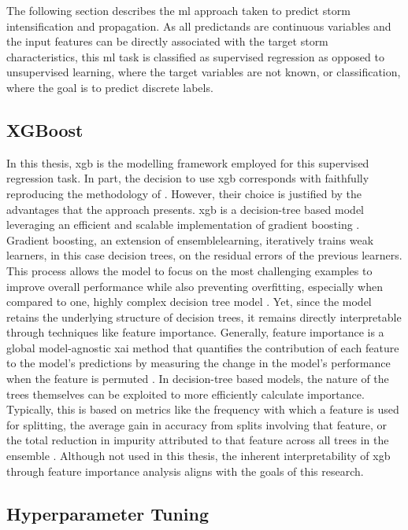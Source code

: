 The following section describes the \acrshort{ml} approach taken to predict storm intensification and propagation. As all predictands are continuous variables and the input features can be directly associated with the target storm characteristics, this \acrshort{ml} task is classified as supervised regression as opposed to unsupervised learning, where the target variables are not known, or classification, where the goal is to predict discrete labels.

\subsection{XGBoost}

In this thesis, \acrfull{xgb} is the modelling framework employed for this supervised regression task. In part, the decision to use \acrshort{xgb} corresponds with faithfully reproducing the methodology of \cite{Hunt2024}. However, their choice is justified by the advantages that the approach presents. \acrshort{xgb} is a decision-tree based model leveraging an efficient and scalable implementation of gradient boosting \citep{Chen2016}. Gradient boosting, an extension of \gls{ensemblelearning}, iteratively trains weak learners, in this case decision trees, on the residual errors of the previous learners. This process allows the model to focus on the most challenging examples to improve overall performance while also preventing overfitting, especially when compared to one, highly complex decision tree model \citep{Friedman2001}. Yet, since the model retains the underlying structure of decision trees, it remains directly interpretable through techniques like feature importance. Generally, feature importance is a global model-agnostic \acrshort{xai} method that quantifies the contribution of each feature to the model's predictions by measuring the change in the model's performance when the feature is permuted \citep{Musolf2022}. In decision-tree based models, the nature of the trees themselves can be exploited to more efficiently calculate importance. Typically, this is based on metrics like the frequency with which a feature is used for splitting, the average gain in accuracy from splits involving that feature, or the total reduction in impurity attributed to that feature across all trees in the ensemble \citep{Louppe2013}. Although not used in this thesis, the inherent interpretability of \acrshort{xgb} through feature importance analysis aligns with the goals of this research.

\subsection{Hyperparameter Tuning}

